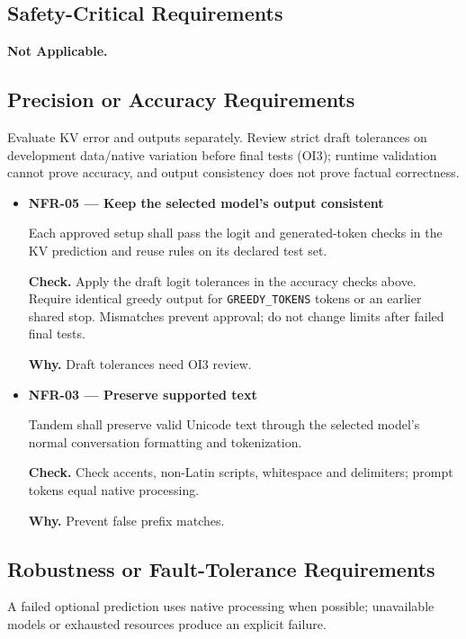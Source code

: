 \documentclass[12pt]{article}
\begin{document}
\subsection{Safety-Critical Requirements}
\textbf{Not Applicable.}


\subsection{Precision or Accuracy Requirements}
Evaluate KV error and outputs separately. Review strict draft tolerances on
development data/native variation before final tests (OI3); runtime validation
cannot prove accuracy, and output consistency does not prove factual correctness.

\begin{itemize}
\item {}\label{req:NFR-05}
\textbf{NFR-05 --- Keep the selected model's output consistent}\par
Each approved setup shall pass the logit and generated-token checks in the KV prediction and reuse rules on its declared test set.\par
\textbf{Check.} Apply the draft logit tolerances in the accuracy checks above. Require identical greedy output for \texttt{GREEDY\_TOKENS} tokens or an earlier shared stop. Mismatches prevent approval; do not change limits after failed final tests.\par
\textbf{Why.} Draft tolerances need OI3 review.


\item {}\label{req:NFR-03}
\textbf{NFR-03 --- Preserve supported text}\par
Tandem shall preserve valid Unicode text through the selected model's normal conversation formatting and tokenization.\par
\textbf{Check.} Check accents, non-Latin scripts, whitespace and delimiters; prompt tokens equal native processing.\par
\textbf{Why.} Prevent false prefix matches.
\end{itemize}


\subsection{Robustness or Fault-Tolerance Requirements}
A failed optional prediction uses native processing when possible; unavailable models or exhausted resources produce an explicit failure.
\end{document}
